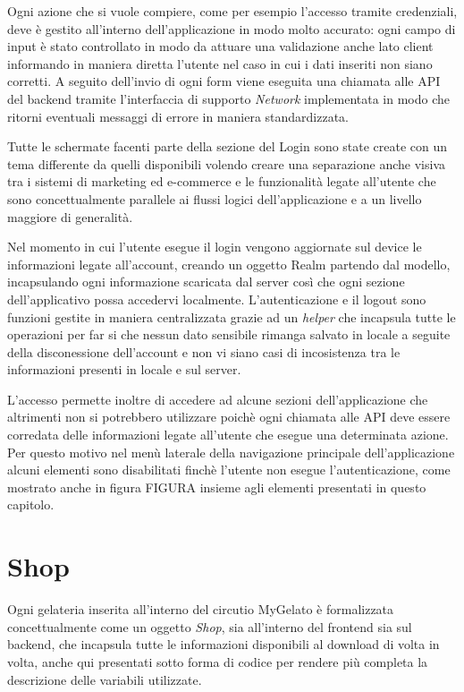 Ogni azione che si vuole compiere, come per esempio l'accesso tramite
credenziali, deve è gestito all'interno dell'applicazione in modo
molto accurato: ogni campo di input è stato controllato in modo da
attuare una validazione anche lato client informando in maniera diretta
l'utente nel caso in cui i dati inseriti non siano corretti. A seguito
dell'invio di ogni form viene eseguita una chiamata alle API del backend
tramite l'interfaccia di supporto \emph{Network} implementata in modo
che ritorni eventuali messaggi di errore in maniera standardizzata.

Tutte le schermate facenti parte della sezione del Login sono state
create con un tema differente da quelli disponibili volendo creare
una separazione anche visiva tra i sistemi di marketing ed e-commerce
e le funzionalità legate all'utente che sono concettualmente parallele
ai flussi logici dell'applicazione e a un livello maggiore di generalità.

Nel momento in cui l'utente esegue il login vengono aggiornate sul
device le informazioni legate all'account, creando un oggetto Realm
partendo dal modello, incapsulando ogni informazione scaricata dal
server così che ogni sezione dell'applicativo possa accedervi localmente.
L'autenticazione e il logout sono funzioni gestite in maniera centralizzata
grazie ad un \emph{helper} che incapsula tutte le operazioni per far
si che nessun dato sensibile rimanga salvato in locale a seguite della
disconessione dell'account e non vi siano casi di incosistenza tra
le informazioni presenti in locale e sul server.

L'accesso permette inoltre di accedere ad alcune sezioni dell'applicazione
che altrimenti non si potrebbero utilizzare poichè ogni chiamata alle
API deve essere corredata delle informazioni legate all'utente che
esegue una determinata azione. Per questo motivo nel menù laterale
della navigazione principale dell'applicazione alcuni elementi sono
disabilitati finchè l'utente non esegue l'autenticazione, come mostrato
anche in figura FIGURA insieme agli elementi presentati in questo
capitolo.

\section{Shop}

Ogni gelateria inserita all'interno del circutio MyGelato è formalizzata
concettualmente come un oggetto \emph{Shop}, sia all'interno del frontend
sia sul backend, che incapsula tutte le informazioni disponibili al
download di volta in volta, anche qui presentati sotto forma di codice
per rendere più completa la descrizione delle variabili utilizzate.

